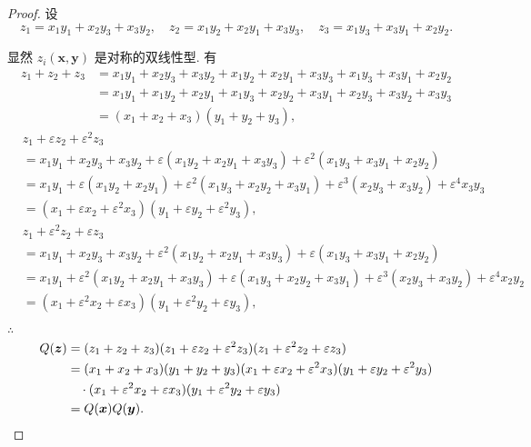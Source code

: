 \documentclass[color=black,device=normal,lang=cn,mode=geye]{elegantnote}
\begin{document}
\begin{proof}
    设
    \[z_1=x_1y_1+x_2y_3+x_3y_2,\quad z_2=x_1y_2+x_2y_1+x_3y_3,\quad z_3=x_1y_3+x_3y_1+x_2y_2.\]

    显然 $z_i(\boldsymbol{x},\boldsymbol{y})$ 是对称的双线性型. 有
    \begin{align*}
        z_1+z_2+z_3 & =x_1y_1+x_2y_3+x_3y_2+x_1y_2+x_2y_1+x_3y_3+x_1y_3+x_3y_1+x_2y_2 \\
        & =x_1y_1+x_1y_2+x_2y_1+x_1y_3+x_2y_2+x_3y_1+x_2y_3+x_3y_2+x_3y_3 \\
        & =(x_1+x_2+x_3)(y_1+y_2+y_3),
    \end{align*}
    \begin{align*}
        & z_1+\varepsilon z_2+\varepsilon^2z_3 \\
        & =x_1y_1+x_2y_3+x_3y_2+\varepsilon(x_1y_2+x_2y_1+x_3y_3)+\varepsilon^2(x_1y_3+x_3y_1+x_2y_2) \\
        & =x_1y_1+\varepsilon(x_1y_2+x_2y_1)+\varepsilon^2(x_1y_3+x_2y_2+x_3y_1)+\varepsilon^3(x_2y_3+x_3y_2)+\varepsilon^4x_3y_3 \\
        & =(x_1+\varepsilon x_2+\varepsilon^2x_3)(y_1+\varepsilon y_2+\varepsilon^2y_3),
    \end{align*}
    \begin{align*}
        & z_1+\varepsilon^2z_2+\varepsilon z_3 \\
        & =x_1y_1+x_2y_3+x_3y_2+\varepsilon^2(x_1y_2+x_2y_1+x_3y_3)+\varepsilon(x_1y_3+x_3y_1+x_2y_2) \\
        & =x_1y_1+\varepsilon^2(x_1y_2+x_2y_1+x_3y_3)+\varepsilon(x_1y_3+x_2y_2+x_3y_1)+\varepsilon^3(x_2y_3+x_3y_2)+\varepsilon^4x_2y_2 \\
        & =(x_1+\varepsilon^2x_2+\varepsilon x_3)(y_1+\varepsilon^2y_2+\varepsilon y_3),
    \end{align*}

    $\therefore$
    \begin{align*}
        Q(\boldsymbol{z}) & =(z_1+z_2+z_3)(z_1+\varepsilon z_2+\varepsilon^2z_3)(z_1+\varepsilon^2z_2+\varepsilon z_3) \\
        & =(x_1+x_2+x_3)(y_1+y_2+y_3)(x_1+\varepsilon x_2+\varepsilon^2x_3)(y_1+\varepsilon y_2+\varepsilon^2y_3) \\
        & \quad\cdot(x_1+\varepsilon^2x_2+\varepsilon x_3)(y_1+\varepsilon^2y_2+\varepsilon y_3) \\
        & =Q(\boldsymbol{x})Q(\boldsymbol{y}).\qedhere
    \end{align*}
\end{proof}
\end{document}

